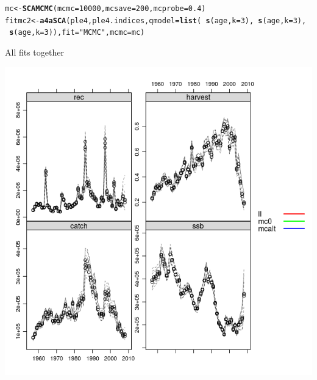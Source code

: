 \documentclass[a4paper,english,10pt]{article}\usepackage[]{graphicx}\usepackage[]{color}
\makeatletter
\def\maxwidth{ %
  \ifdim\Gin@nat@width>\linewidth
    \linewidth
  \else
    \Gin@nat@width
  \fi
}
\newcommand{\hlnum}[1]{\textcolor[rgb]{0.686,0.059,0.569}{#1}}%
\newcommand{\hlstr}[1]{\textcolor[rgb]{0.192,0.494,0.8}{#1}}%
\newcommand{\hlopt}[1]{\textcolor[rgb]{0,0,0}{#1}}%
\newcommand{\hlstd}[1]{\textcolor[rgb]{0.345,0.345,0.345}{#1}}%
\newcommand{\hlkwb}[1]{\textcolor[rgb]{0.69,0.353,0.396}{#1}}%
\newcommand{\hlkwc}[1]{\textcolor[rgb]{0.333,0.667,0.333}{#1}}%
\newcommand{\hlkwd}[1]{\textcolor[rgb]{0.737,0.353,0.396}{\textbf{#1}}}%
\newenvironment{kframe}{%
 \def\at@end@of@kframe{}%
 \ifinner\ifhmode%
  \def\at@end@of@kframe{\end{minipage}}%
  \begin{minipage}{\columnwidth}%
 \fi\fi%
 \def\FrameCommand##1{\hskip\@totalleftmargin \hskip-\fboxsep
 \colorbox{shadecolor}{##1}\hskip-\fboxsep
     \hskip-\linewidth \hskip-\@totalleftmargin \hskip\columnwidth}%
 \MakeFramed {\advance\hsize-\width
   \@totalleftmargin\z@ \linewidth\hsize
   \@setminipage}}%
 {\par\unskip\endMakeFramed%
 \at@end@of@kframe}
\newenvironment{knitrout}{}{} %
\makeatother
\begin{document}
\begin{knitrout}
\color{fgcolor}\begin{kframe}
\begin{alltt}
\hlstd{mc} \hlkwb{<-} \hlkwd{SCAMCMC}\hlstd{(}\hlkwc{mcmc} \hlstd{=} \hlnum{10000}\hlstd{,} \hlkwc{mcsave} \hlstd{=} \hlnum{200}\hlstd{,} \hlkwc{mcprobe} \hlstd{=} \hlnum{0.4}\hlstd{)}
\hlstd{fitmc2} \hlkwb{<-} \hlkwd{a4aSCA}\hlstd{(ple4, ple4.indices,} \hlkwc{qmodel} \hlstd{=} \hlkwd{list}\hlstd{(}\hlopt{~}\hlkwd{s}\hlstd{(age,} \hlkwc{k} \hlstd{=} \hlnum{3}\hlstd{),} \hlopt{~}\hlkwd{s}\hlstd{(age,} \hlkwc{k} \hlstd{=} \hlnum{3}\hlstd{),}
    \hlopt{~}\hlkwd{s}\hlstd{(age,} \hlkwc{k} \hlstd{=} \hlnum{3}\hlstd{)),} \hlkwc{fit} \hlstd{=} \hlstr{"MCMC"}\hlstd{,} \hlkwc{mcmc} \hlstd{= mc)}
\end{alltt}
\end{kframe}
\end{knitrout}

All fits together

\begin{knitrout}
\color{fgcolor}

{\centering \includegraphics[width=\maxwidth]{figure/unnamed-chunk-36-1} 

}



\end{knitrout}
\end{document}
